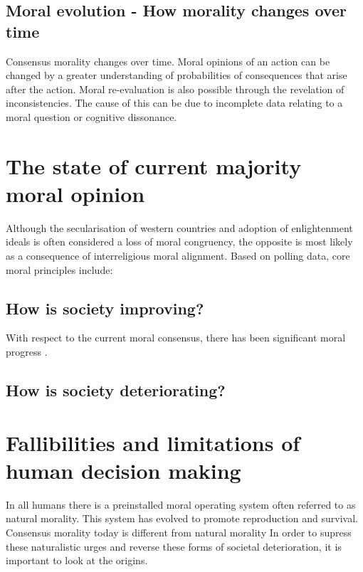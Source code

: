 \subsection{Moral evolution - How morality changes over time}
Consensus morality changes over time.
Moral opinions of an action can be changed by a greater understanding of probabilities of consequences that arise after the action.
Moral re-evaluation is also possible through the revelation of inconsistencies.
The cause of this can be due to incomplete data relating to a moral question or cognitive dissonance.

\section{The state of current majority moral opinion}
Although the secularisation of western countries and adoption of enlightenment ideals is often considered a loss of moral congruency, the opposite is most likely as a consequence of interreligious moral alignment.
Based on polling data, core moral principles include:

\subsection{How is society improving?}
With respect to the current moral consensus, there has been significant moral progress \cite{pinker2011better}.

\subsection{How is society deteriorating?}

\section{Fallibilities and limitations of human decision making}
In all humans there is a preinstalled moral operating system often referred to as natural morality.
This system has evolved to promote reproduction and survival.
Consensus morality today is different from natural morality
In order to supress these naturalistic urges and reverse these forms of societal deterioration, it is important to look at the origins.
